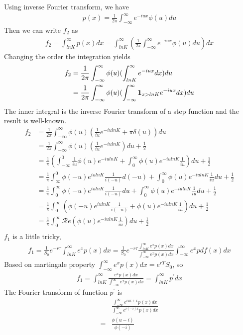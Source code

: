 \documentclass[a4paper]{article}
\begin{document}
Using inverse Fourier transform, we have
\begin{align*}
	p(x) = \frac{1}{2\pi} \int_{-\infty}^{\infty} e^{-iux}  \phi(u) du
\end{align*}
Then we can write $f_2$ as
\begin{align*}
	f_2  = \int_{lnK}^{\infty}  p(x) dx
	   = \int_{lnK}^{\infty} ( \frac{1}{2\pi} \int_{-\infty}^{\infty} e^{-iux}  \phi(u) du) dx
\end{align*}
Changing the order the integration yields
\begin{align*}
	f_2 & = \frac{1}{2\pi} \int_{-\infty}^{\infty}\phi(u) (\int_{lnK}^{\infty} e^{-iux}  dx) du \\
	  & = \frac{1}{2\pi} \int_{-\infty}^{\infty}\phi(u)(\int_{-\infty}^{\infty} {\bf 1}_{x > lnK}e^{-iux}dx) du\\
\end{align*}
The inner integral is the inverse Fourier transform of a step function and the result is well-known.
\begin{align*}
	f_2 & = \frac{1}{2\pi} \int_{-\infty}^{\infty}\phi(u)( \frac{1}{iu }e^{-i u lnK} + \pi \delta(u)) du \\
	  & = \frac{1}{2\pi} \int_{-\infty}^{\infty}\phi(u)( \frac{1}{iu }e^{-i u lnK} ) du + \frac{1}{2} \\
	  & = \frac{1}{\pi} (\int_{-\infty}^{0}\frac{1}{iu }\phi(u) e^{-i u lnK} +  \int_{0}^{\infty}\phi(u) e^{-i u lnK}\frac{1}{iu } ) du + \frac{1}{2} \\
	  & = \frac{1}{\pi} \int_{\infty}^{0}\phi(-u) e^{i u lnK}\frac{1}{i(-u) }d(-u) +\int_{0}^{\infty}\phi(u) e^{-i u lnK}\frac{1}{iu }  du + \frac{1}{2} \\
	  & = \frac{1}{\pi} \int_{0}^{\infty}\phi(-u) e^{i u lnK}\frac{1}{i(-u) }du +\int_{0}^{\infty}\phi(u) e^{-i u lnK}\frac{1}{iu }  du + \frac{1}{2} \\
	  & = \frac{1}{\pi} \int_{0}^{\infty}(\phi(-u) e^{i u lnK}\frac{1}{i(-u) } + \phi(u) e^{-i u lnK}\frac{1}{iu })  du + \frac{1}{2} \\
	  & = \frac{1}{\pi} \int_{0}^{\infty}\mathcal Re( \phi(u) e^{-i u lnK}\frac{1}{iu })  du + \frac{1}{2} \\
\end{align*}
$f_1$ is a little tricky, 
\begin{align*}
        f_1 = \frac{1}{S_0} e^{-r \tau}\int_{lnK}^{\infty} e^x p(x) dx
	  = \frac{1}{S_0} e^{-r \tau}\frac{\int_{lnK}^{\infty} e^x p(x) dx}{\int_{-\infty}^{\infty} e^x p(x) dx}
	  \int_{-\infty}^{\infty} e^x pdf(x) dx
\end{align*}
Based on martingale property $\int_{-\infty}^{\infty} e^x p(x) dx = e^{rT}S_0$, so
\begin{align*}
	f_1 = \int_{lnK}^{\infty} \frac{e^x p(x) dx}{\int_{-\infty}^{\infty} e^x p(x) dx}
	 =  \int_{lnK}^{\infty} {p}^{'} dx
\end{align*}
The Fourier transform of function ${p}^{'}$ is
\begin{align*}
	&\frac{\int_{-\infty}^{\infty} e^{iux + x}p(x)dx}{\int_{-\infty}^{\infty} e^{i(-i)x} p(x) dx} \\
	=&\frac{\phi(u-i)}{\phi(-i)}\\
\end{align*}
\end{document}
